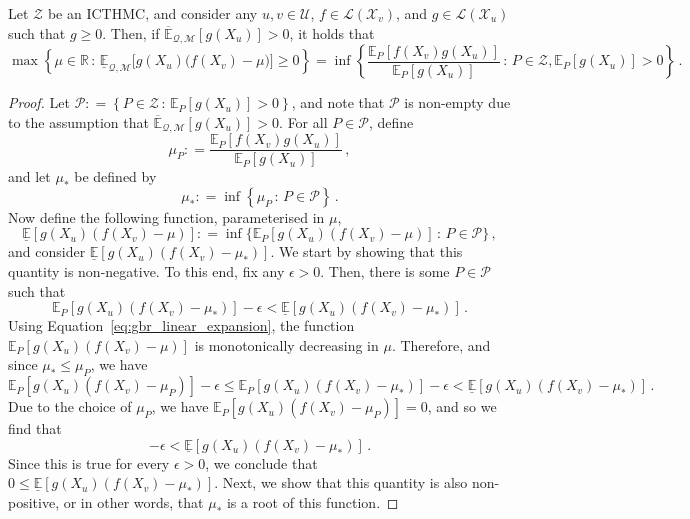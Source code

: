 \documentclass[twoside,11pt]{article}
\newcommand{\reals}{\mathbb{R}}
\newcommand{\states}{\mathcal{X}}
\newcommand{\lexp}{\underline{\mathbb{E}}_{\rateset,\mathcal{M}}}
\newcommand{\uexp}{\overline{\mathbb{E}}_{\rateset,\mathcal{M}}}
\newcommand{\gambles}{\mathcal{L}}
\newcommand{\rateset}{\mathcal{Q}}
\newcommand{\coloneqq}{:\!=}
\begin{document}
\begin{lemma}\label{lemma:general_regular_extension}
Let $\mathcal{Z}$ be an ICTHMC, and consider any $u,v\in\mathcal{U}$, $f\in\gambles(\states_v)$, and $g\in\gambles(\states_u)$ such that $g\geq 0$. Then, if $\uexp[g(X_u)]>0$, it holds that
\begin{equation*}
\max\left\{\mu\in\reals\,:\, \lexp\bigl[g(X_u)\bigl(f(X_v) - \mu\bigr)\bigr] \geq 0\right\} = \inf\left\{ \frac{\mathbb{E}_P[f(X_v)g(X_u)]}{\mathbb{E}_P[g(X_u)]}\,:\,P\in\mathcal{Z}, \mathbb{E}_P[g(X_u)]>0 \right\}\,.
\end{equation*}
\end{lemma}
\begin{proof}
Let $\mathcal{P}\coloneqq \left\{ P\in\mathcal{Z}\,:\, \mathbb{E}_P[g(X_u)] > 0\right\}$, and note that $\mathcal{P}$ is non-empty due to the assumption that $\uexp[g(X_u)]>0$. For all $P\in\mathcal{P}$, define
\begin{equation*}
\mu_P \coloneqq \frac{\mathbb{E}_P[f(X_v)g(X_u)]}{\mathbb{E}_P[g(X_u)]}\,,
\end{equation*}
and let $\mu_*$ be defined by
\begin{equation*}
\mu_* \coloneqq \inf\left\{\mu_P\,:\,P\in\mathcal{P} \right\}\,.
\end{equation*}
Now define the following function, parameterised in $\mu$,
\begin{equation*}
\underline{\mathbb{E}}[g(X_u)(f(X_v) - \mu)] \coloneqq \inf\{\mathbb{E}_P[g(X_u)(f(X_v) - \mu)]\,:\,P\in\mathcal{P} \}\,,
\end{equation*}
and consider $\underline{\mathbb{E}}[g(X_u)(f(X_v) - \mu_*)]$. We start by showing that this quantity is non-negative. To this end, fix any $\epsilon>0$. Then, there is some $P\in\mathcal{P}$ such that
\begin{equation*}
\mathbb{E}_P[g(X_u)(f(X_v) - \mu_*)] - \epsilon < \underline{\mathbb{E}}[g(X_u)(f(X_v) - \mu_*)]\,.
\end{equation*}
Using Equation~\eqref{eq:gbr_linear_expansion}, the function $\mathbb{E}_P[g(X_u)(f(X_v) - \mu)]$ is monotonically decreasing in $\mu$. Therefore, and since $\mu_*\leq \mu_P$, we have
\begin{equation*}
\mathbb{E}_P[g(X_u)(f(X_v) - \mu_P)] - \epsilon \leq \mathbb{E}_P[g(X_u)(f(X_v) - \mu_*)] - \epsilon < \underline{\mathbb{E}}[g(X_u)(f(X_v) - \mu_*)]\,.
\end{equation*}
Due to the choice of $\mu_P$, we have $\mathbb{E}_P[g(X_u)(f(X_v) - \mu_P)]=0$, and so we find that
\begin{equation*}
-\epsilon < \underline{\mathbb{E}}[g(X_u)(f(X_v) - \mu_*)]\,.
\end{equation*}
Since this is true for every $\epsilon>0$, we conclude that $0\leq \underline{\mathbb{E}}[g(X_u)(f(X_v) - \mu_*)]$. Next, we show that this quantity is also non-positive, or in other words, that $\mu_*$ is a root of this function. 


\end{proof}
\end{document}
